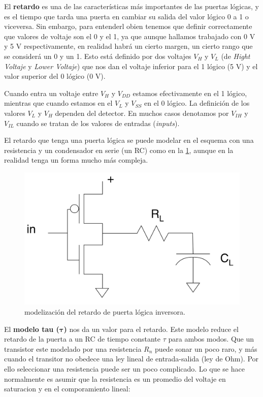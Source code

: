 El \textbf{retardo} es una de las características más importantes de las puertas lógicas, y es el tiempo que tarda una puerta en cambiar su salida del valor lógico 0 a 1 o viceversa. Sin embargo, para entenderl obien tenemos que definir correctamente que valores de voltaje son el 0 y el 1, ya que aunque hallamos trabajado con 0 V y 5 V respectivamente, en realidad habrá un cierto margen, un cierto rango que se considerá un 0 y un 1. Esto está definido por dos voltajes $V_H$ y $V_L$ (de \textit{Hight Voltaje} y \textit{Lower Voltaje}) que nos dan el voltaje inferior para el 1 lógico (5 V) y el valor superior del 0 lógico (0 V).

Cuando entra un voltaje entre $V_H$ y $V_{DD}$ estamos efectivamente en el 1 lógico, mientras que cuando estamos en el $V_L$ y $V_{SS}$ en el 0 lógico. La definición de los valores $V_L$ y $V_H$ dependen del detector. En muchos casos denotamos por $V_{IH}$ y $V_{IL}$ cuando se tratan de los valores de entradas (\textit{inputs}). 

El retardo que tenga una puerta lógica se puede modelar en el esquema con una resistencia y un condensador en serie (un RC) como en la \cref{Fig:02-Inversora_RC}, aunque en la realidad tenga un forma mucho más compleja.

\begin{figure}[H] \centering
    \includegraphics[width=0.7\linewidth]{Imagenes/02/02-Inversor_2.png}    
    \caption{modelización del retardo de puerta lógica inversora.}
    \label{Fig:02-Inversora_RC}
\end{figure}


El \textbf{modelo tau ($\boldsymbol{\tau}$)} nos da un valor para el retardo. Este modelo reduce el retardo de la puerta a un RC de tiempo constante $\tau$ para ambos modos. Que un transistor este modelado por una resistencia $R_n$ puede sonar un poco raro, y más cuando el transitor no obedece una ley lineal de entrada-salida (ley de Ohm). Por ello seleccionar una resistencia puede ser un poco complicado. Lo que se hace normalmente es asumir que la resistencia es un promedio del voltaje en saturacion y en el comporamiento lineal: 

